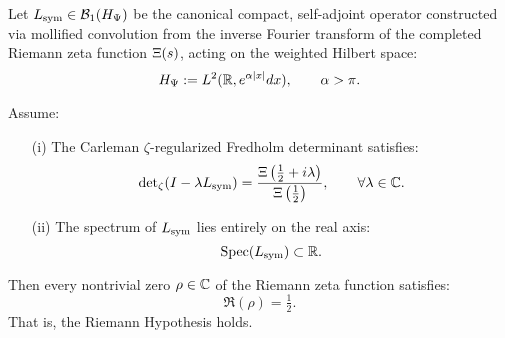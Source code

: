 \begin{lemma}
\label{lem:real_spectrum_implies_rh_rigidity}

Let \( L_{\mathrm{sym}} \in \mathcal{B}_1(H_{\Psi}) \) be the canonical compact, self-adjoint operator constructed via mollified convolution from the inverse Fourier transform of the completed Riemann zeta function \( \Xi(s) \), acting on the weighted Hilbert space:
\[
H_{\Psi} := L^2(\mathbb{R}, e^{\alpha |x|} dx), \qquad \alpha > \pi.
\]

Assume:
\begin{enumerate}
  \item[\textup{(i)}] The Carleman \(\zeta\)-regularized Fredholm determinant satisfies:
  \[
  \det\nolimits_\zeta(I - \lambda L_{\mathrm{sym}}) = \frac{\Xi\left(\tfrac{1}{2} + i\lambda\right)}{\Xi\left(\tfrac{1}{2}\right)}, \qquad \forall \lambda \in \mathbb{C}.
  \]

  \item[\textup{(ii)}] The spectrum of \( L_{\mathrm{sym}} \) lies entirely on the real axis:
  \[
  \operatorname{Spec}(L_{\mathrm{sym}}) \subset \mathbb{R}.
  \]
\end{enumerate}

Then every nontrivial zero \( \rho \in \mathbb{C} \) of the Riemann zeta function satisfies:
\[
\Re(\rho) = \tfrac{1}{2}.
\]
That is, the Riemann Hypothesis holds.
\end{lemma}
